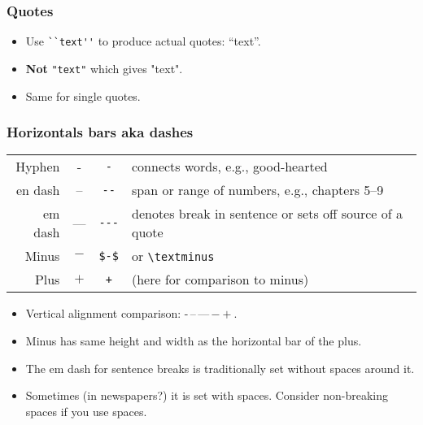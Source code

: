 \documentclass[aspectratio=1610,hyperref={colorlinks,linkcolor=}]{beamer}
\begin{document}
\begin{frame}[fragile]
    \frametitle{Quotes}
    \begin{itemize}
        \item Use \verb+``text''+ to produce actual quotes: ``text''.
        \item \textbf{Not} \verb+"text"+ which gives "text". %
        \item Same for single quotes.
    \end{itemize}
\end{frame}

\begin{frame}[fragile]
    \frametitle{Horizontals bars aka dashes}
    \begin{tabular}{rccl}
        Hyphen & - & \verb+-+ & connects words, e.g., good-hearted \\ %
        en dash & -- & \verb+--+ & span or range of numbers, e.g., chapters 5--9 \\ %
        em dash & --- & \verb+---+ & denotes break in sentence or sets off source of a quote \\
        Minus & $-$ & \verb+$-$+ & or \verb+\textminus+ \\
        Plus & $+$ & \verb$+$ & (here for comparison to minus)  \\
    \end{tabular}
    \begin{itemize}
        \item Vertical alignment comparison: {\Huge -\,--\,---\,$-+$}. %
        \item Minus has same height and width as the horizontal bar of the plus.
        \item The em dash for sentence breaks is traditionally set without spaces around it.
        \item Sometimes (in newspapers?) it is set with spaces. Consider non-breaking spaces if you use spaces.
    \end{itemize}
\end{frame}
\end{document}
